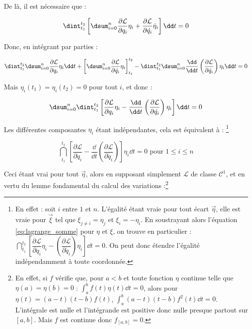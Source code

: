 De là, il est nécessaire que :

\begin{equation}
 \dint_{t_1}^{t_2} \left [ \dsum_{i=0}^{n} \dfrac{\partial \mathcal{L}}{\partial q_i} \eta_i + \dfrac{\partial \mathcal{L}}{\partial \dot{q_i}}  \dot{\eta}_i  \right ] \dd t = 0
\end{equation}

Donc, en intégrant par parties :

\begin{equation}
 \dint_{t_1}^{t_2} \dsum_{i=0}^{n} \dfrac{\partial \mathcal{L}}{\partial q_i} \eta_i \dd t + \left [ \dsum_{i=0}^{n} \dfrac{\partial \mathcal{L}}{\partial \dot{q_i}}  \eta_i \right ]_{t_1}^{t_2} -  \dint_{t_1}^{t_2} \dsum_{i=0}^{n} \dfrac{\dd}{\dd t} \left ( \dfrac{\partial \mathcal{L}}{\partial \dot{q_i}} \right ) \eta_i  \dd t = 0
\end{equation}

Mais $\eta_i(t_1) = \eta_i (t_2) = 0$ pour tout $i$, et donc :

\begin{equation}
\dsum_{i=0}^{n}  \dint_{t_1}^{t_2}  \left [  \dfrac{\partial \mathcal{L}}{\partial q_i} \eta_i - \dfrac{\dd}{\dd t} \left ( \dfrac{\partial \mathcal{L}}{\partial \dot{q_i}} \right ) \eta_i  \right ] \dd t = 0 \label{eq:lagrange_somme}
\end{equation}

Les différentes composantes $\eta_i$ étant indépendantes, cela est équivalent à :
\footnote{En effet : soit $i$ entre $1$ et $n$. L'égalité étant vraie pour tout écart $\vec{\eta}$, elle est vraie pour $\vec{\xi}$ tel que $\xi_{j \neq i} = \eta_j$ et $\xi_i = -\eta_i$. En soustrayant alors l'équation \eqref{eq:lagrange_somme} pour $\eta$ et $\xi$, on trouve en particulier :  $\dint_{t_1}^{t_2}  \left [  \dfrac{\partial \mathcal{L}}{\partial q_i}\eta_i  - \left ( \dfrac{\partial \mathcal{L}}{\partial \dot{q_i}}  \right ) \eta_i \right ] \dd t = 0$. On peut donc étendre l'égalité indépendamment à toute coordonnée. }

\begin{equation}
  \dint_{t_1}^{t_2}  \left [  \dfrac{\partial \mathcal{L}}{\partial q_i} - \dfrac{\dd}{\dd t} \left ( \dfrac{\partial \mathcal{L}}{\partial \dot{q_i}} \right ) \right ] \eta_i \dd t = 0 \textrm{ pour } 1\leq i \leq n
\end{equation}

Ceci étant vrai pour tout $\vec{\eta}$, alors en supposant simplement $\mathcal{L}$ de classe $\mathcal{C}^1$, et en vertu du lemme fondamental du calcul des variations :\footnote{En effet, si $f$ vérifie que, pour $a < b$ et toute fonction $\eta$ continue telle que $\eta(a) = \eta(b) = 0$  : $\int_a^b f(t)\eta(t) \dd t = 0$, alors pour $\eta(t) = (a-t)(t - b)f(t)$, $\int_a^b (a-t)(t-b)f^2(t)\dd t = 0$. L'intégrale est nulle et l'intégrande est positive donc nulle presque partout sur $[a,b]$. Mais $f$ est continue donc $f_{[a,b]} = 0$.}

